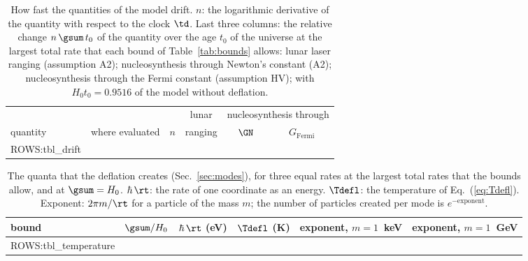 \begin{table}
\caption{\label{tab:xdrift}How fast the quantities of the model drift. $n$: the logarithmic derivative
of the quantity with respect to the clock $\td$. Last three columns: the relative change
$n\,\gsum\,t_0$ of the quantity over the age $t_0$ of the universe at the largest total rate that each
bound of Table~\ref{tab:bounds} allows: lunar laser ranging (assumption A2); nucleosynthesis through
Newton's constant (A2); nucleosynthesis through the Fermi constant (assumption HV); with
$H_0t_0=0.9516$ of the model without deflation.}
\begin{ruledtabular}
\begin{tabular}{p{}p{}cccc}
 & & & lunar & \multicolumn{2}{c}{nucleosynthesis through} \\
quantity & where evaluated & $n$ & ranging & $\GN$ & $G_{\mathrm{Fermi}}$ \\
\hline
{{ROWS:tbl_drift}}
\end{tabular}
\end{ruledtabular}
\end{table}

\begin{table}
\caption{\label{tab:xtemperature}The quanta that the deflation creates (Sec.~\ref{sec:modes}), for
three equal rates at the largest total rates that the bounds allow, and at $\gsum=H_0$. $\hbar\,\rt$:
the rate of one coordinate as an energy. $\Tdefl$: the temperature of Eq.~(\ref{eq:Tdefl}).
Exponent: $2\pi m/\rt$ for a particle of the mass $m$; the number of particles created per mode is
$e^{-\mathrm{exponent}}$.}
\begin{ruledtabular}
\begin{tabular}{lccccc}
bound & $\gsum/H_0$ & $\hbar\,\rt$ (eV) & $\Tdefl$ (K) & exponent, $m=1$~keV & exponent, $m=1$~GeV \\
\hline
{{ROWS:tbl_temperature}}
\end{tabular}
\end{ruledtabular}
\end{table}

